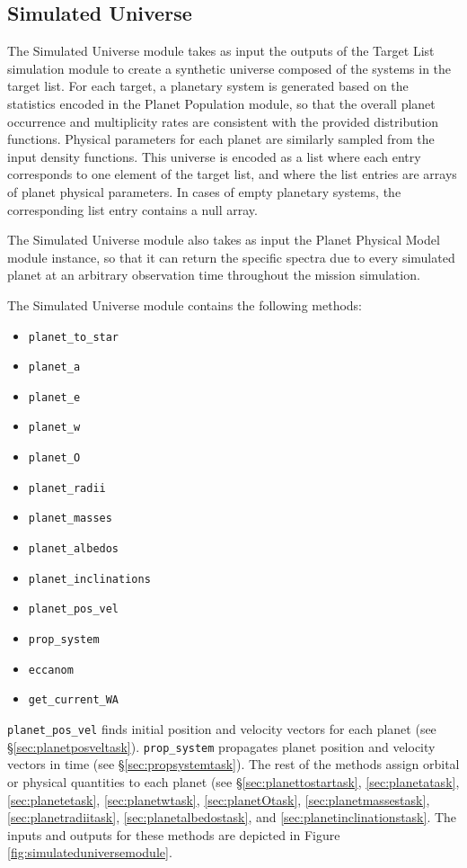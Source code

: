 \documentclass[cleanfoot]{asme2ej}
\newcommand{\reffig}[1]{Figure \ref{#1}}
\begin{document}
\subsection{Simulated Universe} \label{sec:simulateduniverse}
The Simulated Universe module takes as input the outputs of the Target List simulation module to create a synthetic universe composed of the systems in the target list.  For each target, a planetary system is generated based on the statistics encoded in the Planet Population module, so that the overall planet occurrence and multiplicity rates are consistent with the provided distribution functions.  Physical parameters for each planet are similarly sampled from the input density functions.  This universe is encoded as a list where each entry corresponds to one element of the target list, and where the list entries are arrays of planet physical parameters.  In cases of empty planetary systems, the corresponding list entry contains a null array.

The Simulated Universe module also takes as input the Planet Physical Model module instance, so that it can return the specific spectra due to every simulated planet at an arbitrary observation time throughout the mission simulation.

The Simulated Universe module contains the following methods: 
\begin{itemize}
\item[] \verb+planet_to_star+
\item[]  \verb+planet_a+
\item[]  \verb+planet_e+
\item[]  \verb+planet_w+
\item[]  \verb+planet_O+
\item[]  \verb+planet_radii+
\item[]  \verb+planet_masses+
\item[]  \verb+planet_albedos+
\item[]  \verb+planet_inclinations+
\item[]  \verb+planet_pos_vel+
\item[]  \verb+prop_system+
\item[]  \verb+eccanom+
\item[]  \verb+get_current_WA+
\end{itemize}
 \verb+planet_pos_vel+ finds initial position and velocity vectors for each planet (see \S\ref{sec:planetposveltask}).  \verb+prop_system+ propagates planet position and velocity vectors in time (see \S\ref{sec:propsystemtask}).  The rest of the methods assign orbital or physical quantities to each planet (see \S\ref{sec:planettostartask}, \ref{sec:planetatask}, \ref{sec:planetetask}, \ref{sec:planetwtask}, \ref{sec:planetOtask}, \ref{sec:planetmassestask}, \ref{sec:planetradiitask}, \ref{sec:planetalbedostask}, and \ref{sec:planetinclinationstask}. The inputs and outputs for these methods are depicted in \reffig{fig:simulateduniversemodule}.
\end{document}
